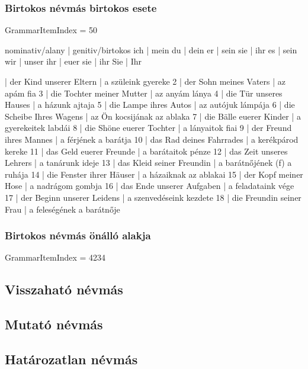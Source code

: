 \documentclass{article}
\newenvironment{desc}{\verbatim}{\endverbatim}
\newenvironment{exmp}{\verbatim}{\endverbatim}
\begin{document}
\subsubsection{Birtokos névmás birtokos esete}

GrammarItemIndex = 50

\begin{desc}
nominativ/alany | genitiv/birtokos 
ich             | mein
du              | dein
er              | sein
sie             | ihr
es              | sein
wir             | unser
ihr             | euer
sie             | ihr
Sie             | Ihr
\end{desc}

\begin{exmp}
1 | der Kind unserer Eltern | a szüleink gyereke
2 | der Sohn meines Vaters | az apám fia
3 | die Tochter meiner Mutter | az anyám lánya
4 | die Tür unseres Hauses | a házunk ajtaja
5 | die Lampe ihres Autos | az autójuk lámpája
6 | die Scheibe Ihres Wagens | az Ön kocsijának az ablaka
7 | die Bälle euerer Kinder | a gyerekeitek labdái
8 | die Shöne euerer Tochter | a lányaitok fiai
9 | der Freund ihres Mannes | a férjének a barátja
10 | das Rad deines Fahrrades | a kerékpárod kereke
11 | das Geld euerer Freunde | a barátaitok pénze
12 | das Zeit unseres Lehrers | a tanárunk ideje
13 | das Kleid seiner Freundin | a barátnőjének (f) a ruhája
14 | die Fenster ihrer Häuser | a házaiknak az ablakai
15 | der Kopf meiner Hose | a nadrágom gombja
16 | das Ende unserer Aufgaben | a feladataink vége
17 | der Beginn unserer Leidens | a szenvedéseink kezdete
18 | die Freundin seiner Frau | a feleségének a barátnője
\end{exmp}

\subsubsection{Birtokos névmás önálló alakja}

GrammarItemIndex = 4234

\subsection{Visszaható névmás}

\subsection{Mutató névmás}

\subsection{Határozatlan névmás}
\end{document}
